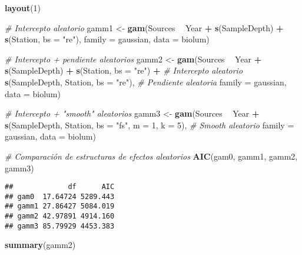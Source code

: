 \documentclass[
]{book}
\newenvironment{Shaded}{\begin{snugshade}}{\end{snugshade}}
\newcommand{\CommentTok}[1]{\textcolor[rgb]{0.56,0.35,0.01}{\textit{#1}}}
\newcommand{\DataTypeTok}[1]{\textcolor[rgb]{0.13,0.29,0.53}{#1}}
\newcommand{\DecValTok}[1]{\textcolor[rgb]{0.00,0.00,0.81}{#1}}
\newcommand{\KeywordTok}[1]{\textcolor[rgb]{0.13,0.29,0.53}{\textbf{#1}}}
\newcommand{\NormalTok}[1]{#1}
\newcommand{\OperatorTok}[1]{\textcolor[rgb]{0.81,0.36,0.00}{\textbf{#1}}}
\newcommand{\StringTok}[1]{\textcolor[rgb]{0.31,0.60,0.02}{#1}}
\begin{document}
\begin{Shaded}
\begin{Highlighting}[]
\KeywordTok{layout}\NormalTok{(}\DecValTok{1}\NormalTok{)}

\CommentTok{# Intercepto aleatorio}
\NormalTok{gamm1 <-}\StringTok{ }\KeywordTok{gam}\NormalTok{(Sources }\OperatorTok{~}\StringTok{ }\NormalTok{Year }\OperatorTok{+}\StringTok{ }\KeywordTok{s}\NormalTok{(SampleDepth) }\OperatorTok{+}\StringTok{ }\KeywordTok{s}\NormalTok{(Station, }\DataTypeTok{bs =} \StringTok{"re"}\NormalTok{), }\DataTypeTok{family =}\NormalTok{ gaussian, }\DataTypeTok{data =}\NormalTok{ biolum)}

\CommentTok{# Intercepto + pendiente aleatorios}
\NormalTok{gamm2 <-}\StringTok{ }\KeywordTok{gam}\NormalTok{(Sources }\OperatorTok{~}\StringTok{ }\NormalTok{Year }\OperatorTok{+}\StringTok{  }\KeywordTok{s}\NormalTok{(SampleDepth) }\OperatorTok{+}
\StringTok{               }\KeywordTok{s}\NormalTok{(Station, }\DataTypeTok{bs =} \StringTok{"re"}\NormalTok{) }\OperatorTok{+}\StringTok{ }\CommentTok{# Intercepto aleatorio}
\StringTok{               }\KeywordTok{s}\NormalTok{(SampleDepth, Station, }\DataTypeTok{bs =} \StringTok{"re"}\NormalTok{), }\CommentTok{# Pendiente aleatoria}
             \DataTypeTok{family =}\NormalTok{ gaussian, }\DataTypeTok{data =}\NormalTok{ biolum)}

\CommentTok{# Intercepto + "smooth" aleatorios}
\NormalTok{gamm3 <-}\StringTok{ }\KeywordTok{gam}\NormalTok{(Sources }\OperatorTok{~}\StringTok{ }\NormalTok{Year }\OperatorTok{+}\StringTok{ }\KeywordTok{s}\NormalTok{(SampleDepth, Station, }\DataTypeTok{bs =} \StringTok{"fs"}\NormalTok{, }\DataTypeTok{m =} \DecValTok{1}\NormalTok{, }\DataTypeTok{k =} \DecValTok{5}\NormalTok{), }\CommentTok{# Smooth aleatorio}
             \DataTypeTok{family =}\NormalTok{ gaussian, }\DataTypeTok{data =}\NormalTok{ biolum)}

\CommentTok{# Comparación de estructuras de efectos aleatorios}
\KeywordTok{AIC}\NormalTok{(gam0, gamm1, gamm2, gamm3)}
\end{Highlighting}
\end{Shaded}

\begin{verbatim}
##             df      AIC
## gam0  17.64724 5289.443
## gamm1 27.86427 5084.019
## gamm2 42.97891 4914.160
## gamm3 85.79929 4453.383
\end{verbatim}

\begin{Shaded}
\begin{Highlighting}[]
\KeywordTok{summary}\NormalTok{(gamm2)}
\end{Highlighting}
\end{Shaded}
\end{document}
